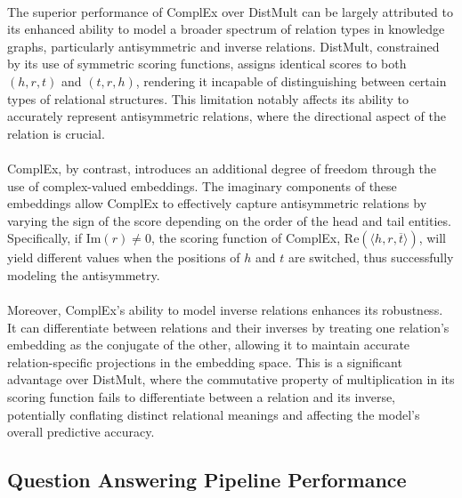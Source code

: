 \documentclass[12pt]{article}
\begin{document}
\paragraph{}The superior performance of ComplEx over DistMult can be largely attributed to its enhanced ability to model a broader spectrum of relation types in knowledge graphs, particularly antisymmetric and inverse relations. DistMult, constrained by its use of symmetric scoring functions, assigns identical scores to both \((h, r, t)\) and \((t, r, h)\), rendering it incapable of distinguishing between certain types of relational structures. This limitation notably affects its ability to accurately represent antisymmetric relations, where the directional aspect of the relation is crucial. 

\paragraph{}ComplEx, by contrast, introduces an additional degree of freedom through the use of complex-valued embeddings. The imaginary components of these embeddings allow ComplEx to effectively capture antisymmetric relations by varying the sign of the score depending on the order of the head and tail entities. Specifically, if \(\text{Im}(r) \neq 0\), the scoring function of ComplEx, \(\text{Re}(\langle h, r, \overline{t} \rangle)\), will yield different values when the positions of \(h\) and \(t\) are switched, thus successfully modeling the antisymmetry.

\paragraph{}Moreover, ComplEx's ability to model inverse relations enhances its robustness. It can differentiate between relations and their inverses by treating one relation's embedding as the conjugate of the other, allowing it to maintain accurate relation-specific projections in the embedding space. This is a significant advantage over DistMult, where the commutative property of multiplication in its scoring function fails to differentiate between a relation and its inverse, potentially conflating distinct relational meanings and affecting the model's overall predictive accuracy. 

\subsection{Question Answering Pipeline Performance}
\end{document}
